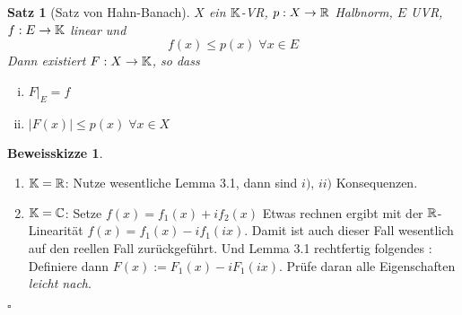\documentclass[ngerman]{report}
\theoremstyle{plain}%
\newtheorem{thm}{Satz}[chapter]
\theoremstyle{definition}%
\theoremstyle{myStyle}
\newtheorem*{proof*}{Beweisskizze}
\newenvironment{hinweise}{
			\footnotesize \begin{proof*}}{\hfill $\square$ \end{proof*}\normalsize
			}
\begin{document}
	\begin{thm}[Satz von Hahn-Banach]
		$X$ ein $\mathbb{K}$-VR, $p: X \to \mathbb{R}$ Halbnorm, $E$ UVR, $f: E \to \mathbb{K}$ linear und
			$$ f(x) \leq p(x) \; \forall x \in E$$
	Dann existiert $F: X \to \mathbb{K}$, so dass 
		\begin{enumerate}[(i)]
			\item $F|_E = f$
			\item $|F(x)| \leq p(x) \; \forall x \in X$
		\end{enumerate}
	\end{thm}

	\begin{hinweise}
		\begin{enumerate}[{Fall} 1]
			\item $\mathbb{K} = \mathbb{R}$: Nutze wesentliche Lemma 3.1, dann sind $i)$, $ii)$ Konsequenzen.
			\item $\mathbb{K} = \mathbb{C}$: Setze $f(x) = f_1(x) + i f_2(x)$ Etwas rechnen ergibt mit der $\mathbb{R}$-Linearität 
				$f(x) = f_1(x) - i f_1(ix)$. Damit ist auch dieser Fall wesentlich auf den reellen Fall zurückgeführt. Und Lemma 3.1 rechtfertig folgendes :
				Definiere dann $F(x) := F_1(x) - i F_1(ix)$. Prüfe daran alle Eigenschaften \textit{leicht nach}.
		\end{enumerate}
	\end{hinweise}
\end{document}
